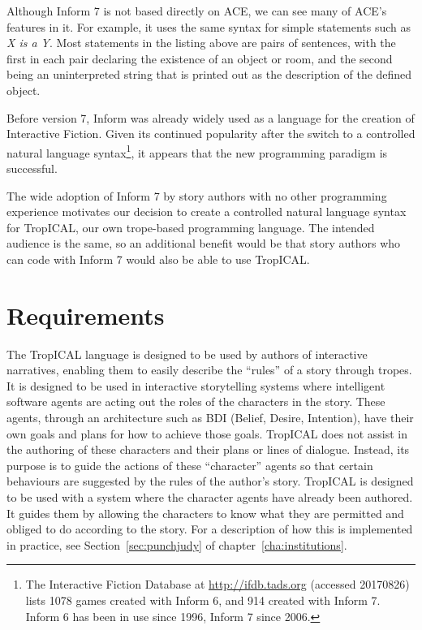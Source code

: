 \documentclass[11pt]{report}
\begin{document}
Although Inform 7 is not based directly on ACE, we can see many of ACE's
features in it. For example, it uses the same syntax for simple statements such
as \emph{X is a Y}. Most statements in the listing above are pairs of sentences,
with the first in each pair declaring the existence of an object or room, and
the second being an uninterpreted string that is printed out as the description
of the defined object.

Before version 7, Inform was already widely used as a language for the creation
of Interactive Fiction. Given its continued popularity after the switch to
a controlled natural language syntax\footnote{The Interactive Fiction Database
  at \url{http://ifdb.tads.org} (accessed 20170826) lists 1078 games created
  with Inform 6, and 914 created with Inform 7. Inform 6 has been in use since
  1996, Inform 7 since 2006.}, it appears that the new programming
paradigm is successful.

The wide adoption of Inform 7 by story authors with no other programming
experience motivates our decision to create a controlled natural language syntax
for TropICAL, our own trope-based programming language. The intended audience is
the same, so an additional benefit would be that story authors who can code with
Inform 7 would also be able to use TropICAL.

\section{Requirements}
\label{sec:t-requirements}

The TropICAL language is designed to be used by authors of interactive
narratives, enabling them to easily describe the ``rules'' of a story through
tropes. It is designed to be used in interactive storytelling systems where
intelligent software agents are acting out the roles of the characters in the
story. These agents, through an architecture such as BDI (Belief, Desire,
Intention), have their own goals and plans for how to achieve those goals.
TropICAL does not assist in the authoring of these characters and their plans or
lines of dialogue. Instead, its purpose is to guide the actions of these
``character'' agents so that certain behaviours are suggested by the rules of the author's
story. TropICAL is designed to be used with a system where the character agents have
already been authored. It guides them by allowing the characters to know what
they are permitted and obliged to do according to the story. For a description of how this is
implemented in practice, see Section~\ref{sec:punchjudy} of
chapter~\ref{cha:institutions}.
\end{document}

